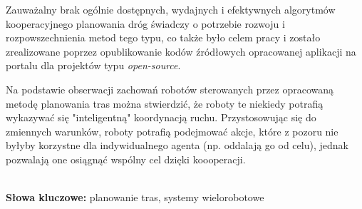 \begin{singlespacing}
Zauważalny brak ogólnie dostępnych, wydajnych i efektywnych algorytmów kooperacyjnego planowania dróg świadczy o potrzebie rozwoju i rozpowszechnienia metod tego typu, co także było celem pracy i zostało zrealizowane poprzez opublikowanie kodów źródłowych opracowanej aplikacji na portalu dla projektów typu {\it open-source}.

Na podstawie obserwacji zachowań robotów sterowanych przez opracowaną metodę planowania tras można stwierdzić, że roboty te niekiedy potrafią wykazywać się "inteligentną" koordynacją ruchu.
Przystosowując się do zmiennych warunków, roboty potrafią podejmować akcje, które z pozoru nie byłyby korzystne dla indywidualnego agenta (np. oddalają go od celu), jednak pozwalają one osiągnąć wspólny cel dzięki koooperacji.

\flushbottom
\textbf{\\Słowa kluczowe: }planowanie tras, systemy wielorobotowe
\end{singlespacing}

